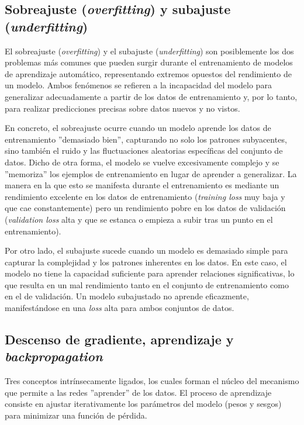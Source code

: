 \subsection{Sobreajuste (\textit{overfitting}) y subajuste (\textit{underfitting})}

El sobreajuste (\textit{overfitting}) y el subajuste (\textit{underfitting}) son posiblemente los dos problemas más comunes que pueden surgir durante el entrenamiento de modelos de aprendizaje automático, representando extremos opuestos del rendimiento de un modelo. Ambos fenómenos se refieren a la incapacidad del modelo para generalizar adecuadamente a partir de los datos de entrenamiento y, por lo tanto, para realizar predicciones precisas sobre datos nuevos y no vistos.

En concreto, el sobreajuste ocurre cuando un modelo aprende los datos de entrenamiento ''demasiado bien'', capturando no solo los patrones subyacentes, sino también el ruido y las fluctuaciones aleatorias específicas del conjunto de datos. Dicho de otra forma, el modelo se vuelve excesivamente complejo y se ''memoriza'' los ejemplos de entrenamiento en lugar de aprender a generalizar. La manera en la que esto se manifesta durante el entrenamiento es mediante un rendimiento excelente en los datos de entrenamiento (\textit{training loss} muy baja y que cae constantemente) pero un rendimiento pobre en los datos de validación (\textit{validation loss} alta y que se estanca o empieza a subir tras un punto en el entrenamiento).

Por otro lado, el subajuste sucede cuando un modelo es demasiado simple para capturar la complejidad y los patrones inherentes en los datos. En este caso, el modelo no tiene la capacidad suficiente para aprender relaciones significativas, lo que resulta en un mal rendimiento tanto en el conjunto de entrenamiento como en el de validación. Un modelo subajustado no aprende eficazmente, manifestándose en una \textit{loss} alta para ambos conjuntos de datos.

\subsection{Descenso de gradiente, aprendizaje y \textit{backpropagation}}

Tres conceptos intrínsecamente ligados, los cuales forman el núcleo del mecanismo que permite a las redes ''aprender'' de los datos. El proceso de aprendizaje consiste en ajustar iterativamente los parámetros del modelo (pesos y sesgos) para minimizar una función de pérdida.

